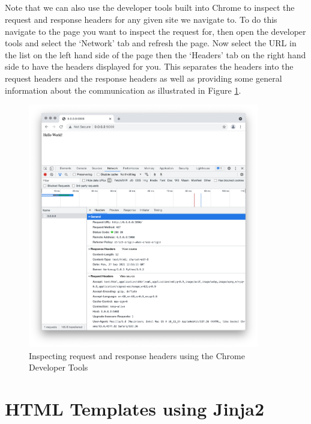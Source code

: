 \documentclass[12pt, a4paper, oneside]{book}
\begin{document}
\paragraph{} Note that we can also use the developer tools built into Chrome to inspect the request and response headers for any given site we navigate to. To do this navigate to the page you want to inspect the request for, then open the developer tools and select the `Network' tab and refresh the page. Now select the URL in the list on the left hand side of the page then the `Headers' tab on the right hand side to have the headers displayed for you. This separates the headers into the request headers and the response headers as well as providing some general information about the communication as illustrated in Figure \ref{fig:chrome-header-inspection}.

\begin{figure}[H]
\centering
\includegraphics[width=0.9\textwidth]{images/chrome-header-inspection}
\caption{Inspecting request and response headers using the Chrome Developer Tools}
\label{fig:chrome-header-inspection}
\end{figure}




\chapter{HTML Templates using Jinja2}
\label{style}
\end{document}
